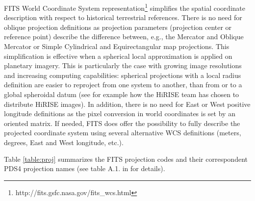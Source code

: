 FITS World Coordinate System
representation\footnote{http://fits.gsfc.nasa.gov/fits\_wcs.html}
simplifies the spatial coordinate description with respect to historical
terrestrial references.
There is no need for oblique projection definitions
\citep{calagreisenI,Snyder1987} as projection parameters
(projection center or reference point)
describe the difference between, e.g., the Mercator and
Oblique Mercator or Simple Cylindrical and
Equirectangular map projections.
This simplification is effective when a spherical local approximation
is applied on planetary imagery.
This is particularly the case with growing image resolutions and
increasing computing capabilities: spherical projections with a local
radius definition are easier to reproject from one system to another, than
from or to a global spheroidal datum (see for example how the HiRISE team
has chosen to distribute HiRISE images).
In addition, there is no need for East or West positive longitude
definitions as the pixel conversion in world coordinates is set by an
oriented matrix.
If needed, FITS does offer the possibility to fully describe the projected
coordinate system using several alternative WCS definitions (meters, degrees,
East and West longitude, etc.)\citep{greisencalaII}.

Table \ref{table:proj} summarizes the FITS projection codes and their
correspondent PDS4 projection names (see table A.1. in \citet{calagreisenI}
for details).

